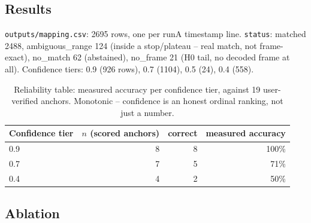 \documentclass[11pt,a4paper]{article}
\begin{document}
\subsection{Results}

\texttt{outputs/mapping.csv}: 2695 rows, one per runA timestamp line. \texttt{status}: matched
2488, ambiguous\_range 124 (inside a stop/plateau -- real match, not frame-exact), no\_match 62
(abstained), no\_frame 21 (H0 tail, no decoded frame at all). Confidence tiers: 0.9 (926 rows),
0.7 (1104), 0.5 (24), 0.4 (558).

\begin{table}[H]
  \centering\footnotesize
  \begin{tabular}{lrrr}
    \toprule
    Confidence tier & $n$ (scored anchors) & correct & measured accuracy \\
    \midrule
    0.9 & 8 & 8 & 100\% \\
    0.7 & 7 & 5 & 71\% \\
    0.4 & 4 & 2 & 50\% \\
    \bottomrule
  \end{tabular}
  \caption{Reliability table: measured accuracy per confidence tier, against 19 user-verified
  anchors. Monotonic -- confidence is an honest ordinal ranking, not just a number.}
  \label{tab:reliability}
\end{table}

\subsection{Ablation}
\label{sec:t2-ablation}
\end{document}

